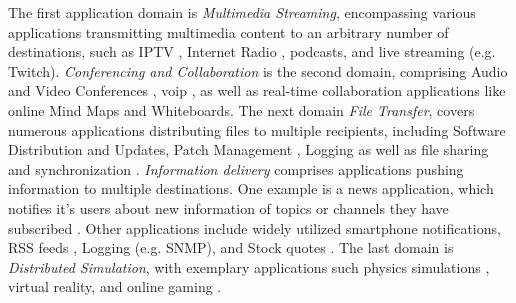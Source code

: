 The first application domain is \textit{Multimedia Streaming}, encompassing 
    various applications transmitting multimedia content to an arbitrary number
    of destinations, such as IPTV \cite{meadcast2, ratnasamy2006revisiting},
    Internet Radio \cite{meadcast1}, podcasts, and live streaming (e.g.
    Twitch).
\textit{Conferencing and Collaboration} is the second domain, comprising Audio
    and Video Conferences \cite{overlay_mc_routing, meadcast2,
    mc_routing_multimedia}, \gls{voip} \cite{gxcast, xcast_rfc}, as well as
    real-time collaboration applications \cite{diot2000deployment, xcast_rfc}
    like online Mind Maps and Whiteboards.
The next domain \textit{File Transfer}, covers numerous applications 
    distributing files to multiple recipients, including Software Distribution
    and Updates, Patch Management \cite{meadcast1, ratnasamy2006revisiting}, 
    Logging \cite{diot2000deployment} as well as file sharing and
    synchronization \cite{overlay_mc_routing}.
\textit{Information delivery} comprises applications pushing information to 
    multiple destinations.
One example is a news application, which notifies it's users about new
    information of topics or channels they have subscribed
    \cite{diot2000deployment}.
Other applications include widely utilized smartphone notifications, RSS feeds
    \cite{ratnasamy2006revisiting}, Logging (e.g. SNMP), and Stock quotes
    \cite{cisco_ipmc}.
The last domain is \textit{Distributed Simulation}, with exemplary applications
    such physics simulations \cite{diot2000deployment}, virtual reality, and
    online gaming \cite{ratnasamy2006revisiting}.

